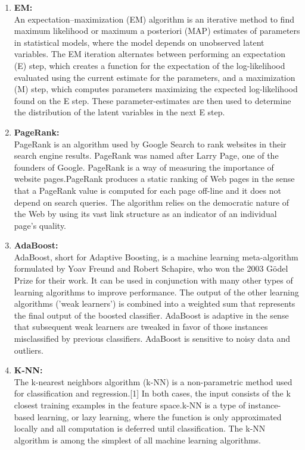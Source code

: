 \documentclass[fleqn,10pt]{SelfArx} %
\begin{document}
\begin{enumerate}
\item \textbf{EM:}\\An expectation–maximization (EM) algorithm is an iterative method to find maximum likelihood or maximum a posteriori (MAP) estimates of parameters in statistical models, where the model depends on unobserved latent variables. The EM iteration alternates between performing an expectation (E) step, which creates a function for the expectation of the log-likelihood evaluated using the current estimate for the parameters, and a maximization (M) step, which computes parameters maximizing the expected log-likelihood found on the E step. These parameter-estimates are then used to determine the distribution of the latent variables in the next E step.
\item \textbf{PageRank:}\\PageRank is an algorithm used by Google Search to rank websites in their search engine results. PageRank was named after Larry Page, one of the founders of Google. PageRank is a way of measuring the importance of website pages.PageRank produces a static ranking of Web pages in the sense that a PageRank value is computed for each page off-line and it does not depend on search queries. The algorithm
relies on the democratic nature of the Web by using its vast link structure as an indicator of an individual page’s quality.
\item\textbf{AdaBoost:}\\AdaBoost, short for Adaptive Boosting, is a machine learning meta-algorithm formulated by Yoav Freund and Robert Schapire, who won the 2003 Gödel Prize for their work. It can be used in conjunction with many other types of learning algorithms to improve performance. The output of the other learning algorithms ('weak learners') is combined into a weighted sum that represents the final output of the boosted classifier. AdaBoost is adaptive in the sense that subsequent weak learners are tweaked in favor of those instances misclassified by previous classifiers. AdaBoost is sensitive to noisy data and outliers.
\item \textbf{K-NN:}\\The k-nearest neighbors algorithm (k-NN) is a non-parametric method used for classification and regression.[1] In both cases, the input consists of the k closest training examples in the feature space.k-NN is a type of instance-based learning, or lazy learning, where the function is only approximated locally and all computation is deferred until classification. The k-NN algorithm is among the simplest of all machine learning algorithms.

\end{enumerate}
\end{document}
